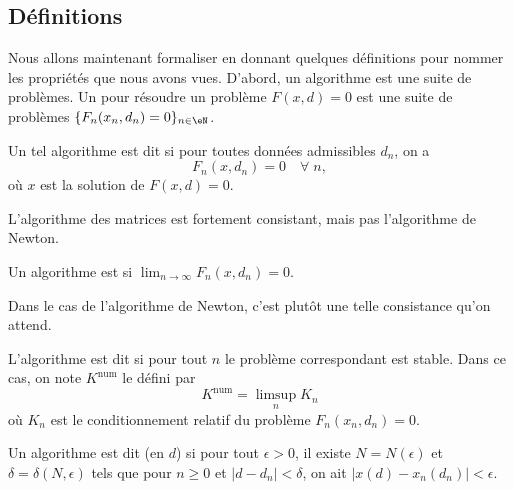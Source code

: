 \subsection{Définitions}

	Nous allons maintenant formaliser en donnant quelques définitions pour nommer les propriétés que nous avons vues. D'abord, un algorithme est une suite de problèmes. Un  pour résoudre un problème $F(x,d)=0$ est une suite de problèmes $\{F_n(x_n,d_n)=0\}_{n\in\eN}$.

\begin{definition}
	Un tel algorithme est dit   si pour toutes données admissibles $d_n$, on a
	\begin{equation}
		F_n(x,d_n)=0\quad\forall \;n,
	\end{equation}
	où $x$ est la solution de $F(x,d)=0$.
\end{definition}
L'algorithme des matrices est fortement consistant, mais pas l'algorithme de Newton.

\begin{definition}
	Un algorithme est  si $\lim_{n\to\infty}F_n(x,d_n)=0$.
\end{definition}
Dans le cas de l'algorithme de Newton, c'est plutôt une telle consistance qu'on attend.

L'algorithme est dit  si pour tout $n$ le problème correspondant est stable.  Dans ce cas, on note $K^{\mbox{num}}$ le   défini par
\begin{equation}
	K^{\mbox{num}}=\limsup_nK_n
\end{equation}
où $K_n$ est le conditionnement relatif du problème $F_n(x_n,d_n)=0$.

\begin{definition}      \label{DefAlgoConverge}
	Un algorithme est dit  (en $d$) si pour tout $\epsilon>0$, il existe $N=N(\epsilon)$ et $\delta=\delta(N,\epsilon)$ tels que pour $n\geq0$ et $|d-d_n|<\delta$, on ait $|x(d)-x_n(d_n)|<\epsilon$.
\end{definition}

